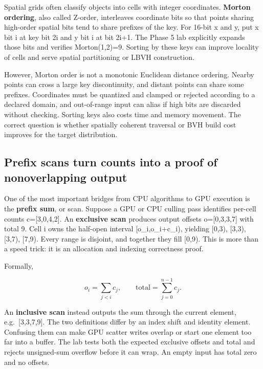 \hypertarget{05-engine-i-ch008-morton-keys-turn-2d-proximity-into-a-sortable-integerwithin-limits}{}

Spatial grids often classify objects into cells with integer coordinates. \textbf{Morton ordering}, also called Z-order, interleaves coordinate bits so that points sharing high-order spatial bits tend to share prefixes of the key. For 16-bit x and y, put x bit i at key bit 2i and y bit i at bit 2i+1. The Phase 5 lab explicitly expands those bits and verifies Morton(1,2)=9. Sorting by these keys can improve locality of cells and serve spatial partitioning or LBVH construction.

However, Morton order is not a monotonic Euclidean distance ordering. Nearby points can cross a large key discontinuity, and distant points can share some prefixes. Coordinates must be quantized and clamped or rejected according to a declared domain, and out-of-range input can alias if high bits are discarded without checking. Sorting keys also costs time and memory movement. The correct question is whether spatially coherent traversal or BVH build cost improves for the target distribution.

\subsection{Prefix scans turn counts into a proof of nonoverlapping output}\label{05-engine-i-ch008-prefix-scans-turn-counts-into-a-proof-of-nonoverlapping-output}

\hypertarget{05-engine-i-ch008-prefix-scans-turn-counts-into-a-proof-of-nonoverlapping-output}{}

One of the most important bridges from CPU algorithms to GPU execution is the \textbf{prefix sum}, or scan. Suppose a GPU or CPU culling pass identifies per-cell counts c={[}3,0,4,2{]}. An \textbf{exclusive scan} produces output offsets o={[}0,3,3,7{]} with total 9. Cell i owns the half-open interval {[}o\_i,o\_i+c\_i), yielding {[}0,3), {[}3,3), {[}3,7), {[}7,9). Every range is disjoint, and together they fill {[}0,9). This is more than a speed trick: it is an allocation and indexing correctness proof.

Formally,

\[
o_i=\sum_{j<i}c_j,\qquad
\mathrm{total}=\sum_{j=0}^{n-1}c_j.
\]

An \textbf{inclusive scan} instead outputs the sum through the current element, e.g.~{[}3,3,7,9{]}. The two definitions differ by an index shift and identity element. Confusing them can make GPU scatter writes overlap or start one element too far into a buffer. The lab tests both the expected exclusive offsets and total and rejects unsigned-sum overflow before it can wrap. An empty input has total zero and no offsets.

